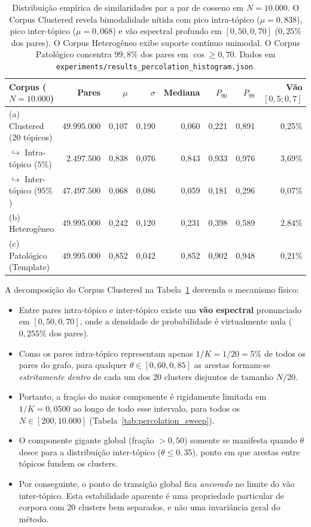 \documentclass[11pt,a4paper]{article}
\theoremstyle{definition}
\begin{document}
\begin{table}[h]
\centering
\small
\begin{tabular}{lrrrrrrr}
\toprule
\textbf{Corpus ($N=10.000$)} & \textbf{Pares} & $\mu$ & $\sigma$ & \textbf{Mediana} & $P_{90}$ & $P_{99}$ & \textbf{V\~ao $[0{,}5; 0{,}7]$} \\
\midrule
(a) Clustered (20 t\'opicos) & $49.995.000$ & 0,107 & 0,190 & 0,060 & 0,221 & 0,891 & 0,25\% \\
\quad $\hookrightarrow$ Intra-t\'opico ($5\%$) & $2.497.500$ & 0,838 & 0,076 & 0,843 & 0,933 & 0,976 & 3,69\% \\
\quad $\hookrightarrow$ Inter-t\'opico ($95\%$) & $47.497.500$ & 0,068 & 0,086 & 0,059 & 0,181 & 0,296 & 0,07\% \\
(b) Heterog\^eneo & $49.995.000$ & 0,242 & 0,120 & 0,231 & 0,398 & 0,589 & 2,84\% \\
(c) Patol\'ogico (Template) & $49.995.000$ & 0,852 & 0,042 & 0,852 & 0,902 & 0,948 & 0,21\% \\
\bottomrule
\end{tabular}
\caption{Distribui\c{c}\~ao emp\'irica de similaridades par a par de cosseno em $N = 10.000$. O Corpus Clustered revela bimodalidade n\'itida com pico intra-t\'opico ($\mu = 0{,}838$), pico inter-t\'opico ($\mu = 0{,}068$) e v\~ao espectral profundo em $[0{,}50, 0{,}70]$ ($0{,}25\%$ dos pares). O Corpus Heterog\^eneo exibe suporte cont\'inuo unimodal. O Corpus Patol\'ogico concentra $99{,}8\%$ dos pares em $\cos \ge 0{,}70$. Dados em \texttt{experiments/results\_percolation\_histogram.json}.}
\label{tab:sim_histograms}
\end{table}

A decomposi\c{c}\~ao do Corpus Clustered na Tabela~\ref{tab:sim_histograms} desvenda o mecanismo f\'isico:
\begin{itemize}
    \item Entre pares intra-t\'opico e inter-t\'opico existe um \textbf{v\~ao espectral} pronunciado em $[0{,}50, 0{,}70]$, onde a densidade de probabilidade \'e virtualmente nula ($0{,}255\%$ dos pares).
    \item Como os pares intra-t\'opico representam apenas $1/K = 1/20 = 5\%$ de todos os pares do grafo, para qualquer $\theta \in [0{,}60, 0{,}85]$ as arestas formam-se \emph{estritamente dentro} de cada um dos 20 clusters disjuntos de tamanho $N/20$.
    \item Portanto, a fra\c{c}\~ao do maior componente \'e rigidamente limitada em $1/K = 0{,}0500$ ao longo de todo esse intervalo, para todos os $N \in [200, 10.000]$ (Tabela~\ref{tab:percolation_sweep}).
    \item O componente gigante global (fra\c{c}\~ao $> 0{,}50$) somente se manifesta quando $\theta$ desce para a distribui\c{c}\~ao inter-t\'opico ($\theta \le 0{,}35$), ponto em que arestas entre t\'opicos fundem os clusters.
    \item Por conseguinte, o ponto de transi\c{c}\~ao global fica \emph{ancorado} no limite do v\~ao inter-t\'opico. Esta estabilidade aparente \'e uma propriedade particular de corpora com 20 clusters bem separados, e n\~ao uma invari\^ancia geral do m\'etodo.
\end{itemize}
\end{document}
